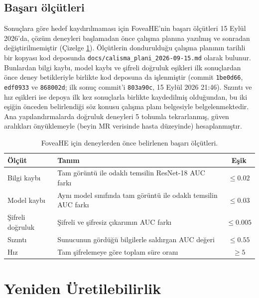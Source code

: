 \subsection{Başarı ölçütleri}\label{sec:fov:criteria}

Sonuçlara göre hedef kaydırılmaması için FoveaHE'nin başarı ölçütleri 15 Eylül 2026'da, çözüm deneyleri başlamadan önce çalışma planına yazılmış ve sonradan değiştirilmemiştir (Çizelge \ref{tbl:olcutler}). Ölçütlerin dondurulduğu çalışma planının tarihli bir kopyası kod deposunda \texttt{docs/calisma\_plani\_2026-09-15.md} olarak bulunur. Bunlardan bilgi kaybı, model kaybı ve şifreli doğruluk eşikleri ilk sonuçlardan önce deney betikleriyle birlikte kod deposuna da işlenmiştir (commit \texttt{1be0d66}, \texttt{edf0933} ve \texttt{868002d}; ilk sonuç commit'i \texttt{803a90c}, 15 Eylül 2026 21:46). Sızıntı ve hız eşikleri ise depoya ilk kez sonuçlarla birlikte kaydedilmiş olduğundan, bu iki eşiğin önceden belirlendiği söz konusu çalışma planı belgesiyle belgelenmektedir. Ana yapılandırmalarda doğruluk deneyleri 5 tohumla tekrarlanmış, güven aralıkları önyüklemeyle (beyin MR verisinde hasta düzeyinde) hesaplanmıştır.

\begin{table}[h!]
{\setlength{\tabcolsep}{5pt}
\caption{FoveaHE için deneylerden önce belirlenen başarı ölçütleri.}
\begin{center}
\vspace{-6mm}
{\small
\begin{tabular}{lp{9cm}c}
\hline\hline
Ölçüt & Tanım & Eşik \\
\hline
Bilgi kaybı & Tam görüntü ile odaklı temsilin ResNet-18 AUC farkı & $\leq 0.02$ \\
Model kaybı & Aynı model sınıfında tam görüntü ile odaklı temsilin AUC farkı & $\leq 0.03$ \\
Şifreli doğruluk & Şifreli ve şifresiz çıkarımın AUC farkı & $\leq 0.005$ \\
Sızıntı & Sunucunun gördüğü bilgilerle saldırgan AUC değeri & $\leq 0.55$ \\
Hız & Tam şifrelemeye göre toplam süre oranı & $\geq 5$ \\
\hline
\end{tabular}}
\vspace{-6mm}
\end{center}
\label{tbl:olcutler}}
\end{table}

\section{Yeniden Üretilebilirlik}\label{sec:repro}

